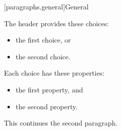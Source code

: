 [paragraphs.general]{General}

\pnum
The header provides these choices:
\begin{itemize}
\item the first choice, or
\item the second choice.
\end{itemize}

\pnum
Each choice has these properties:
\begin{itemize}
\item the first property, and
\item the second property.
\end{itemize}
This continues the second paragraph.
